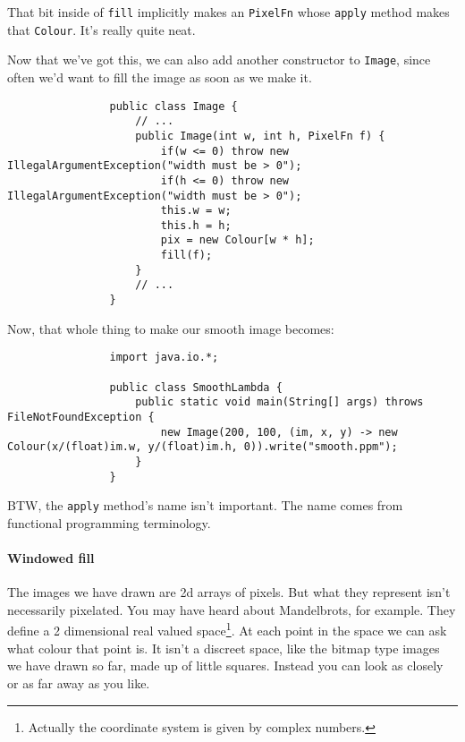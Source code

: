 \documentclass{article}
\begin{document}
            That bit inside of \texttt{fill} implicitly makes an \texttt{PixelFn} whose \texttt{apply} method makes that \texttt{Colour}.
            It's really quite neat.
            
            Now that we've got this, we can also add another constructor to \texttt{Image}, since often we'd want to fill the image as soon
            as we make it.
            
            \begin{verbatim}
                public class Image {
                    // ...
                    public Image(int w, int h, PixelFn f) {
                        if(w <= 0) throw new IllegalArgumentException("width must be > 0");
                        if(h <= 0) throw new IllegalArgumentException("width must be > 0");
                        this.w = w;
                        this.h = h;
                        pix = new Colour[w * h];
                        fill(f);
                    }
                    // ...
                }
            \end{verbatim}
            
            Now, that whole thing to make our smooth image becomes:
            
            \begin{verbatim}
                import java.io.*;

                public class SmoothLambda {
                    public static void main(String[] args) throws FileNotFoundException {
                        new Image(200, 100, (im, x, y) -> new Colour(x/(float)im.w, y/(float)im.h, 0)).write("smooth.ppm");
                    }
                }
            \end{verbatim}
        
            BTW, the \texttt{apply} method's name isn't important. The name comes from functional programming terminology.
        
        \newpage
        \paragraph{Windowed fill}
            The images we have drawn are 2d arrays of pixels. But what they represent isn't necessarily pixelated. You may have heard about
            Mandelbrots, for example. They define a 2 dimensional real valued space\footnote{Actually the coordinate system is given by
            complex numbers.}. At each point in the space we can ask what colour that point is. It isn't a discreet space, like the bitmap
            type images we have drawn so far, made up of little squares. Instead you can look as closely or as far away as you like.
            
\end{document}
